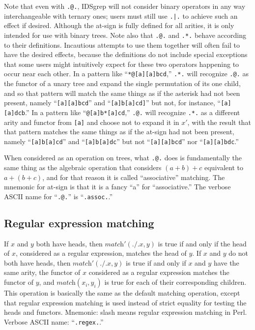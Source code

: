 \documentclass[twocolumn]{report}
\begin{document}
Note that even with \texttt{.@.}, IDSgrep will not consider binary operators
in any way interchangeable with ternary ones; users must still use
\texttt{.|.} to achieve such an effect if desired.  Although the at-sign is
fully defined for all arities, it is only intended for use with binary
trees.  Note also that \texttt{.@.} and \texttt{.*.} behave according to
their definitions.  Incautious attempts to use them together will often fail
to have the desired effects, because the definitions do not include special
exceptions that some users might intuitively expect for these two operators
happening to occur near each other.  In a pattern like
``\texttt{*@[a][a]bcd},'' \texttt{.*.} will recognize \texttt{.@.} as the
functor of a unary tree and expand the single permutation of its one child,
and so that pattern will match the same things as if the asterisk had not
been present, namely ``\texttt{[a][a]bcd}'' and ``\texttt{[a]b[a]cd]}'' but
not, for instance, ``\texttt{[a][a]dcb}.'' In a pattern like
``\texttt{@[a]b*[a]cd},'' \texttt{.@.} will recognize \texttt{.*.} as a
different arity and functor from \texttt{[a]} and choose not to expand it in
$x'$, with the result that that pattern matches the same things as if the
at-sign had not been present, namely ``\texttt{[a]b[a]cd}'' and
``\texttt{[a]b[a]dc}'' but not ``\texttt{[a][a]bcd}'' nor
``\texttt{[a][a]bdc}.''

When considered as an operation on trees, what \texttt{.@.} does is
fundamentally the same thing as the algebraic operation that considers
$(a+b)+c$ equivalent to $a+(b+c)$, and for that reason it is called
``associative'' matching.  The mnemonic for at-sign is that it is a fancy
``a'' for ``associative.''
The verbose ASCII name for ``\texttt{.@.}'' is ``\texttt{.assoc.}.''

\subsection{Regular expression matching}

If $x$ and $y$ both have heads, then $\textit{match}'(\texttt{./.}x,y)$
is true if and only if the head of $x$, considered as a regular
expression, matches the head of $y$. If $x$ and $y$ do not both have
heads, then $\textit{match}'(\texttt{./.}x,y)$ is true if and only if
$x$ and $y$ have the same arity, the functor of $x$ considered as a
regular expression matches the functor of $y$, and
$\textit{match}(x_i,y_i)$ is true for each of their corresponding
children.  This operation is basically the same as the default
matching operation, except that regular expression matching is used
instead of strict equality for testing the heads and functors.
Mnemonic: slash means regular expression matching in Perl.
Verbose ASCII name: ``\texttt{.regex.}.''
\end{document}
